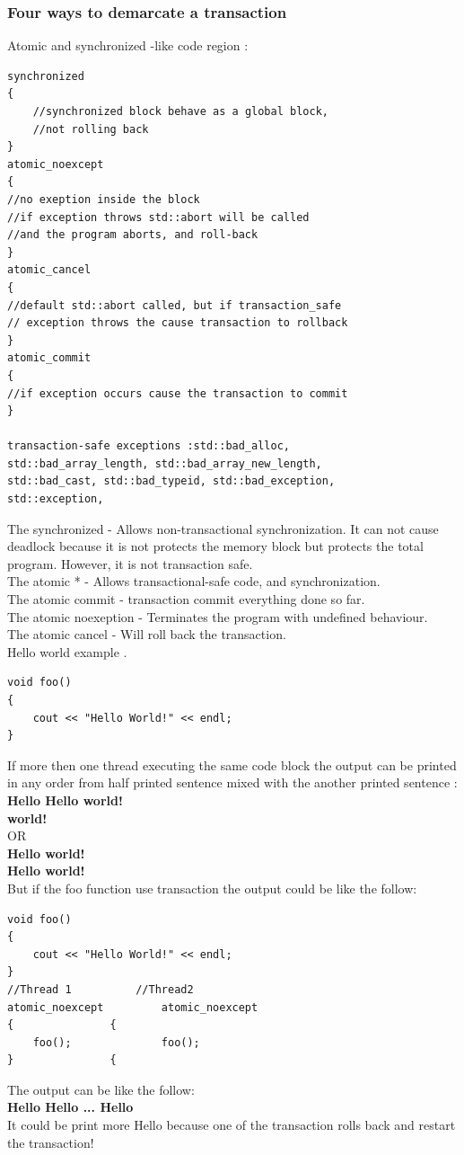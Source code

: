 \documentclass[12pt]{article}
\begin{document}
{\setlength{\parindent}{0cm}
\subsubsection{Four ways to demarcate a transaction}
Atomic and synchronized -like code region :\cite{Torvald}}
\hfill
\begin{lstlisting}
synchronized
{
	//synchronized block behave as a global block,
	//not rolling back
}
atomic_noexcept
{
//no exeption inside the block
//if exception throws std::abort will be called
//and the program aborts, and roll-back
}
atomic_cancel
{  
//default std::abort called, but if transaction_safe
// exception throws the cause transaction to rollback
}
atomic_commit
{
//if exception occurs cause the transaction to commit
}

transaction-safe exceptions :std::bad_alloc,
std::bad_array_length, std::bad_array_new_length,
std::bad_cast, std::bad_typeid, std::bad_exception,
std::exception,
\end{lstlisting}
{\setlength{\parindent}{0cm}
The synchronized - Allows non-transactional synchronization. It can not cause deadlock because it is not protects the memory block but protects the total program. However, it is not transaction safe.\\
The atomic * - Allows transactional-safe code, and synchronization.\\
The atomic commit - transaction commit everything done so far.\\
The atomic noexeption - Terminates the program with undefined behaviour.\\
The atomic cancel - Will roll back the transaction.
\cite{Torvald}\\

Hello world example .
}
\begin{lstlisting}
void foo()
{
	cout << "Hello World!" << endl;
}
\end{lstlisting}
{\setlength{\parindent}{0cm}
If more then one thread executing the same code block the output can be printed in any order from half printed sentence mixed with the another printed sentence :
\textbf{Hello Hello world!\\
world!}\\

OR\\

\textbf{Hello world!\\
Hello world!}\\

But if the foo function use transaction the output could be like the follow:
}
\begin{lstlisting}
void foo()
{
	cout << "Hello World!" << endl;
}
//Thread 1			//Thread2
atomic_noexcept			atomic_noexcept	
{				{
	foo();				foo();
}				{
\end{lstlisting}
{\setlength{\parindent}{0cm}
The output can be like the follow:\\
\textbf{Hello Hello ... Hello}\\
It could be print more Hello because one of the transaction rolls back and restart the transaction!\\
}
\end{document}
